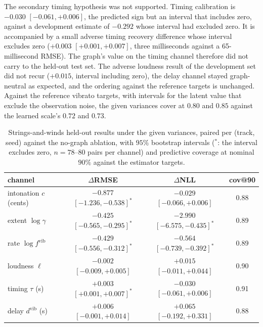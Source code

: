 \documentclass[11pt,a4paper]{report}
\begin{document}
The secondary timing hypothesis was not supported. Timing calibration is
$-0.030$ $[-0.061, +0.006]$, the predicted sign but an interval that
includes zero, against a development estimate of $-0.292$ whose interval had
excluded zero. It is accompanied by a small adverse timing recovery
difference whose interval excludes zero ($+0.003$ $[+0.001, +0.007]$,
three milliseconds against a 65-millisecond RMSE). The graph's value on
the timing channel therefore did not carry to the held-out test set. The
adverse loudness result of the development set did not recur ($+0.015$,
interval including zero), the delay channel
stayed graph-neutral as expected, and the ordering against the reference
targets is unchanged. Against the reference vibrato targets, with intervals
for the latent value that exclude the observation noise, the given variances cover at $0.80$ and $0.85$ against
the learned scale's $0.72$ and $0.73$.

\begin{table}[t]\centering
\caption{Strings-and-winds held-out results under the given variances,
paired per (track, seed) against the no-graph ablation, with $95\%$
bootstrap intervals ($^{*}$: the interval excludes zero, $n = 78$--$80$
pairs per channel) and predictive coverage at nominal $90\%$ against the
estimator targets.}
\label{tab:phase2-conf}
\footnotesize
\begin{tabular}{@{}lccc@{}}
\toprule
channel & $\Delta$RMSE & $\Delta$NLL & cov@90 \\
\midrule
intonation $c$ (cents) & $-0.877$ $[-1.236, -0.538]^{*}$ & $-0.029$ $[-0.066, +0.006]$ & 0.88 \\
extent $\log\gamma$ & $-0.425$ $[-0.565, -0.295]^{*}$ & $-2.990$ $[-6.575, -0.435]^{*}$ & 0.89 \\
rate $\log f^{\mathrm{vib}}$ & $-0.429$ $[-0.556, -0.312]^{*}$ & $-0.564$ $[-0.739, -0.392]^{*}$ & 0.89 \\
loudness $\ell$ & $-0.002$ $[-0.009, +0.005]$ & $+0.015$ $[-0.011, +0.044]$ & 0.90 \\
timing $\tau$ (s) & $+0.003$ $[+0.001, +0.007]^{*}$ & $-0.030$ $[-0.061, +0.006]$ & 0.91 \\
delay $d^{\mathrm{vib}}$ (s) & $+0.006$ $[-0.001, +0.014]$ & $+0.065$ $[-0.192, +0.331]$ & 0.88 \\
\bottomrule
\end{tabular}
\end{table}
\end{document}
